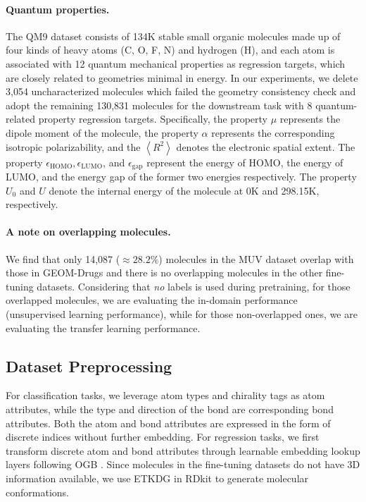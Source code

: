 \paragraph{Quantum properties.}
The QM9 dataset \cite{Ramakrishnan:2014ij} consists of 134K stable small organic molecules made up of four kinds of heavy atoms (C, O, F, N) and hydrogen (H), and each atom is associated with 12 quantum mechanical properties as regression targets, which are closely related to geometries minimal in energy.
In our experiments, we delete 3,054 uncharacterized molecules which failed the geometry consistency check \cite{Ramakrishnan:2014ij} and adopt the remaining 130,831 molecules for the downstream task with 8 quantum-related property regression targets. Specifically, the property $\mu$ represents the dipole moment of the molecule, the property $\alpha$ represents the corresponding isotropic polarizability, and the $\left<R^2\right>$ denotes the electronic spatial extent. The property $\epsilon_{\text{HOMO}}, \epsilon_{\text{LUMO}}$, and $\epsilon_{\text{gap}}$ represent the energy of HOMO, the energy of LUMO, and the energy gap of the former two energies respectively. The property $U_0$ and $U$ denote the internal energy of the molecule at 0K and 298.15K, respectively.

\paragraph{A note on overlapping molecules.}
We find that only 14,087 ($\approx 28.2\%$) molecules in the MUV dataset overlap with those in GEOM-Drugs and there is no overlapping molecules in the other fine-tuning datasets.
Considering that \emph{no} labels is used during pretraining, for those overlapped molecules, we are evaluating the in-domain performance (unsupervised learning performance), while for those non-overlapped ones, we are evaluating the transfer learning performance.

\subsection{Dataset Preprocessing}

For classification tasks, we leverage atom types and chirality tags as atom attributes, while the type and direction of the bond are corresponding bond attributes. Both the atom and bond attributes are expressed in the form of discrete indices without further embedding.
For regression tasks, we first transform discrete atom and bond attributes through learnable embedding lookup layers following OGB \cite{Hu:2020wv}.
Since molecules in the fine-tuning datasets do not have 3D information available, we use ETKDG \cite{Riniker:2015bi} in RDkit \cite{Landrum:2022rd} to generate molecular conformations.

